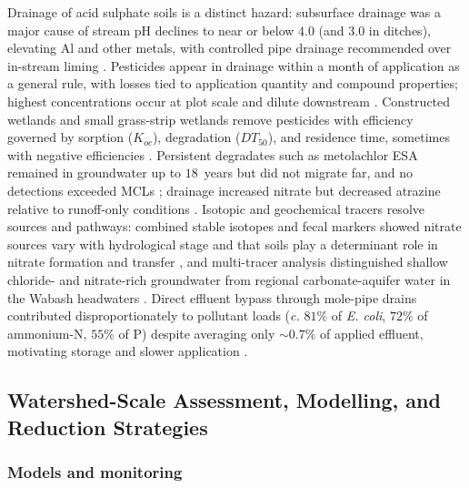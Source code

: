 \documentclass[11pt]{article}
\begin{document}
Drainage of acid sulphate soils is a distinct hazard: subsurface drainage
was a major cause of stream pH declines to near or below $4.0$ (and $3.0$
in ditches), elevating Al and other metals, with controlled pipe drainage
recommended over in-stream liming \parencite{Osterholm2005,Åström2005}.
Pesticides appear in drainage within a month of application as a general
rule, with losses tied to application quantity and compound properties;
highest concentrations occur at plot scale and dilute downstream
\parencite{Tournebize2012}. Constructed wetlands and small grass-strip
wetlands remove pesticides with efficiency governed by sorption ($K_{oc}$),
degradation ($DT_{50}$), and residence time, sometimes with negative
efficiencies \parencite{Tournebize2017,Vallée2015}. Persistent degradates
such as metolachlor ESA remained in groundwater up to $18$~years but did
not migrate far, and no detections exceeded MCLs \parencite{Puckett2005};
drainage increased nitrate but decreased atrazine relative to runoff-only
conditions \parencite{SPALING1995}. Isotopic and geochemical tracers
resolve sources and pathways: combined stable isotopes and fecal markers
showed nitrate sources vary with hydrological stage and that soils play a
determinant role in nitrate formation and transfer \parencite{Briand2017},
and multi-tracer analysis distinguished shallow chloride- and nitrate-rich
groundwater from regional carbonate-aquifer water in the Wabash headwaters
\parencite{Frisbee2022}. Direct effluent bypass through mole-pipe drains
contributed disproportionately to pollutant loads (\emph{c.} $81\%$ of
\emph{E. coli}, $72\%$ of ammonium-N, $55\%$ of P) despite averaging only
$\sim0.7\%$ of applied effluent, motivating storage and slower application
\parencite{Monaghan2004,Monaghan2007}.

\subsection{Watershed-Scale Assessment, Modelling, and Reduction Strategies}

\subsubsection{Models and monitoring}
\end{document}
